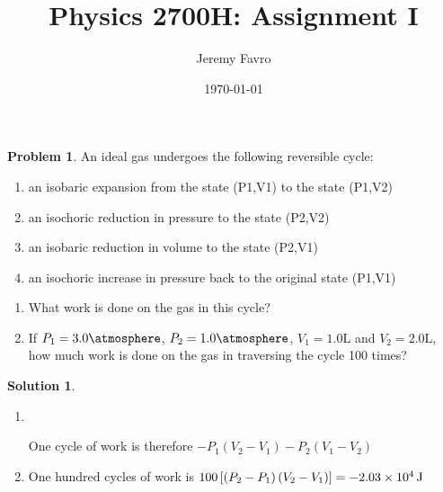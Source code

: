 \documentclass[10pt]{article}
\title{Physics 2700H: Assignment I}
\author{Jeremy Favro}
\date{\today}
\theoremstyle{definition}
\newtheorem{problem}{Problem}
\newtheorem{soln}{Solution}
\begin{document}
\maketitle

\begin{problem}
An ideal gas undergoes the following reversible cycle:

\begin{enumerate}[label=(\roman*)]
  \item an isobaric expansion from the state (P1,V1) to the state (P1,V2)
  \item an isochoric reduction in pressure to the state (P2,V2)
  \item an isobaric reduction in volume to the state (P2,V1)
  \item an isochoric increase in pressure back to the original state (P1,V1)
\end{enumerate}
\begin{enumerate}[label=(\alph*)]
  \item What work is done on the gas in this cycle?
  \item If $P_1 = 3.0\unit{\atmosphere}$, $P_2 = 1.0\unit{\atmosphere}$, $V_1 = 1.0\unit{\liter}$ and $V_2 = 2.0\unit{\liter}$, how much work is done on the gas in traversing the cycle 100 times?
\end{enumerate}
\end{problem}
\begin{soln}~
  \begin{enumerate}[label=(\alph*)]
    \item ~\\
    \begin{center}
    \end{center}
    One cycle of work is therefore $-P_1(V_2-V_1)-P_2(V_1-V_2)$
    \item One hundred cycles of work is $100\left[\left(P_2-P_1\right)(V_2-V_1)\right]=\qty{-2.03d4}{\joule}$
  \end{enumerate}
\end{soln}
\end{document}
